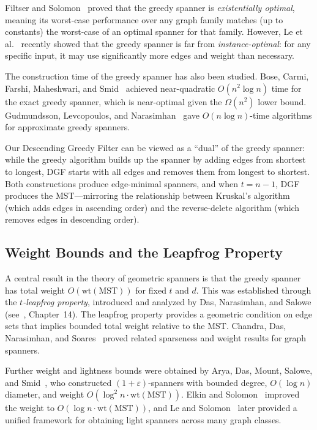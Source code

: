 \documentclass{article}
\begin{document}
Filtser and Solomon~\cite{filtser2020greedy} proved that the greedy spanner is \emph{existentially optimal}, meaning its worst-case performance over any graph family matches (up to constants) the worst-case of an optimal spanner for that family. However, Le et al.~\cite{le2024instance} recently showed that the greedy spanner is far from \emph{instance-optimal}: for any specific input, it may use significantly more edges and weight than necessary.

The construction time of the greedy spanner has also been studied. Bose, Carmi, Farshi, Maheshwari, and Smid~\cite{bose2010computing} achieved near-quadratic $O(n^2 \log n)$ time for the exact greedy spanner, which is near-optimal given the $\Omega(n^2)$ lower bound. Gudmundsson, Levcopoulos, and Narasimhan~\cite{gudmundsson2002fast} gave $O(n \log n)$-time algorithms for approximate greedy spanners.

Our Descending Greedy Filter can be viewed as a ``dual'' of the greedy spanner: while the greedy algorithm builds up the spanner by adding edges from shortest to longest, DGF starts with all edges and removes them from longest to shortest. Both constructions produce edge-minimal spanners, and when $t = n - 1$, DGF produces the MST---mirroring the relationship between Kruskal's algorithm (which adds edges in ascending order) and the reverse-delete algorithm (which removes edges in descending order).

\subsection{Weight Bounds and the Leapfrog Property}

A central result in the theory of geometric spanners is that the greedy spanner has total weight $O(\mathrm{wt}(\mathrm{MST}))$ for fixed $t$ and $d$. This was established through the \emph{$t$-leapfrog property}, introduced and analyzed by Das, Narasimhan, and Salowe (see~\cite{narasimhan2007geometric}, Chapter~14). The leapfrog property provides a geometric condition on edge sets that implies bounded total weight relative to the MST. Chandra, Das, Narasimhan, and Soares~\cite{chandra1992new} proved related sparseness and weight results for graph spanners.

Further weight and lightness bounds were obtained by Arya, Das, Mount, Salowe, and Smid~\cite{arya1995euclidean}, who constructed $(1+\varepsilon)$-spanners with bounded degree, $O(\log n)$ diameter, and weight $O(\log^2 n \cdot \mathrm{wt}(\mathrm{MST}))$. Elkin and Solomon~\cite{elkin2013optimal} improved the weight to $O(\log n \cdot \mathrm{wt}(\mathrm{MST}))$, and Le and Solomon~\cite{le2023unified} later provided a unified framework for obtaining light spanners across many graph classes.
\end{document}

